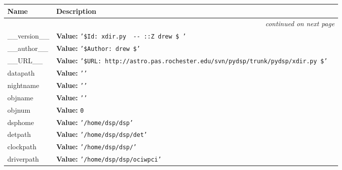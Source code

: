 \begin{longtable}{|p{}|p{}|l}
\cline{1-2}
\cline{1-2} \centering \textbf{Name} & \centering \textbf{Description}& \\
\cline{1-2}
\endhead\cline{1-2}\multicolumn{3}{r}{\small\textit{continued on next page}}\\\endfoot\cline{1-2}
\endlastfoot\raggedright \_\-\_\-v\-e\-r\-s\-i\-o\-n\-\_\-\_\- & \textbf{Value:} 
{\tt '\-\$\-I\-d\-:\-~\-x\-d\-i\-r\-.\-p\-y\-~\-3\-9\-9\-~\-2\-0\-0\-6\--\-0\-6\--\-0\-4\-~\-2\-0\-:\-0\-2\-:\-1\-7\-Z\-~\-d\-r\-e\-w\-~\-\$\-~\-'\-}&\\
\cline{1-2}
\raggedright \_\-\_\-a\-u\-t\-h\-o\-r\-\_\-\_\- & \textbf{Value:} 
{\tt '\-\$\-A\-u\-t\-h\-o\-r\-:\-~\-d\-r\-e\-w\-~\-\$\-'\-}&\\
\cline{1-2}
\raggedright \_\-\_\-U\-R\-L\-\_\-\_\- & \textbf{Value:} 
{\tt '\-\$\-U\-R\-L\-:\-~\-h\-t\-t\-p\-:\-/\-/\-a\-s\-t\-r\-o\-.\-p\-a\-s\-.\-r\-o\-c\-h\-e\-s\-t\-e\-r\-.\-e\-d\-u\-/\-s\-v\-n\-/\-p\-y\-d\-s\-p\-/\-t\-r\-u\-n\-k\-/\-p\-y\-d\-s\-p\-/\-x\-d\-i\-r\-.\-p\-y\-~\-\$\-'\-}&\\
\cline{1-2}
\raggedright d\-a\-t\-a\-p\-a\-t\-h\- & \textbf{Value:} 
{\tt '\-'\-}&\\
\cline{1-2}
\raggedright n\-i\-g\-h\-t\-n\-a\-m\-e\- & \textbf{Value:} 
{\tt '\-'\-}&\\
\cline{1-2}
\raggedright o\-b\-j\-n\-a\-m\-e\- & \textbf{Value:} 
{\tt '\-'\-}&\\
\cline{1-2}
\raggedright o\-b\-j\-n\-u\-m\- & \textbf{Value:} 
{\tt 0\-}&\\
\cline{1-2}
\raggedright d\-s\-p\-h\-o\-m\-e\- & \textbf{Value:} 
{\tt '\-/\-h\-o\-m\-e\-/\-d\-s\-p\-/\-d\-s\-p\-'\-}&\\
\cline{1-2}
\raggedright d\-e\-t\-p\-a\-t\-h\- & \textbf{Value:} 
{\tt '\-/\-h\-o\-m\-e\-/\-d\-s\-p\-/\-d\-s\-p\-/\-d\-e\-t\-'\-}&\\
\cline{1-2}
\raggedright c\-l\-o\-c\-k\-p\-a\-t\-h\- & \textbf{Value:} 
{\tt '\-/\-h\-o\-m\-e\-/\-d\-s\-p\-/\-d\-s\-p\-/\-5\-6\-3\-0\-0\-'\-}&\\
\cline{1-2}
\raggedright d\-r\-i\-v\-e\-r\-p\-a\-t\-h\- & \textbf{Value:} 
{\tt '\-/\-h\-o\-m\-e\-/\-d\-s\-p\-/\-d\-s\-p\-/\-o\-c\-i\-w\-p\-c\-i\-'\-}&\\
\cline{1-2}
\end{longtable}

